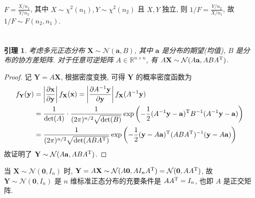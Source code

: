 \documentclass[8pt]{article}
\theoremstyle{compact}
\newtheorem{lemma}{引理}
\begin{document}
\section{}
$F = \frac{X / n_1}{Y / n_2}$, 其中 $X \sim \chi^2(n_1), Y \sim \chi^2(n_2)$ 且 $X, Y$ 独立, 则 $1 / F = \frac{Y / n_2}{X / n_1}$, 故 $1 / F \sim F(n_2, n_1)$.

\section{}
\begin{lemma}
	考虑多元正态分布 $\mathbf X \sim \mathcal N(\mathbf a, B)$, 其中 $\mathbf a$ 是分布的期望(均值), $B$ 是分布的协方差矩阵. 对于任意可逆矩阵 $A \in \mathbb R^{n \times n}$, 有 $A\mathbf X \sim \mathcal N(A\mathbf a, ABA^{\text T})$.
\end{lemma}
\begin{proof}
	记 $\mathbf Y = A\mathbf X$, 根据密度变换, 可得 $\mathbf Y$ 的概率密度函数为 \begin{equation*} \begin{split}		
		f_{\mathbf Y}(\mathbf y) &= \left|\frac{\partial \mathbf x}{\partial \mathbf y}\right| f_{\mathbf X}(\mathbf x) = \left|\frac{\partial A^{-1}\mathbf y}{\partial \mathbf y}\right| f_{\mathbf X}(A^{-1}\mathbf y) \\
		&= \frac{1}{\det(A)} \cdot \frac{1}{(2\pi)^{n/2}\sqrt{\det(B)}} \exp\left(-\frac12(A^{-1}\mathbf y - \mathbf a)^{\text T}B^{-1}(A^{-1}\mathbf y - \mathbf a)\right) \\
		&= \frac{1}{(2\pi)^{n/2}\sqrt{\det(ABA^{\text T})}} \exp\left(-\frac12(\mathbf y - A\mathbf a)^{\text T}(ABA^{\text T})^{-1}(\mathbf y - A\mathbf a)\right)
		\end{split}
	\end{equation*}
	故证明了 $\mathbf Y \sim \mathcal N(A\mathbf a, ABA^{\text T})$.
\end{proof}

当 $\mathbf X \sim \mathcal N(\mathbf 0, I_n)$ 时, $\mathbf Y = A\mathbf X \sim \mathcal N(A\mathbf 0, AI_nA^{\text T}) = \mathcal N(\mathbf 0, AA^{\text T})$, 故 $\mathbf Y \sim \mathcal N(\mathbf 0, I_n)$ 是 $n$ 维标准正态分布的充要条件是 $AA^{\text T} = I_n$, 也即 $A$ 是正交矩阵.

\section{}
\end{document}
